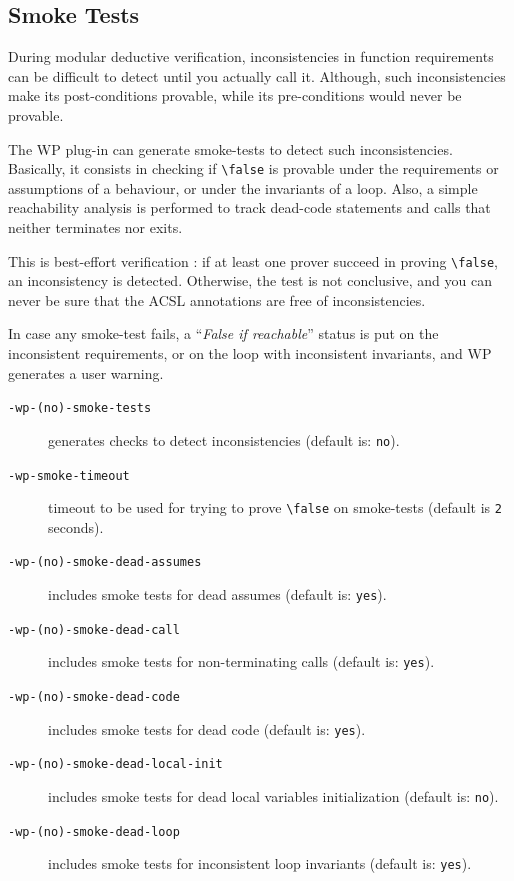 \subsection{Smoke Tests}

During modular deductive verification, inconsistencies in function requirements
can be difficult to detect until you actually call it.
Although, such inconsistencies make its post-conditions provable, while its pre-conditions
would never be provable.

The \textsf{WP} plug-in can generate smoke-tests to detect such inconsistencies.
Basically, it consists in checking if \verb+\false+ is provable under the requirements
or assumptions of a behaviour, or under the invariants of a loop. Also, a simple reachability
analysis is performed to track dead-code statements and calls that neither terminates nor exits.

This is best-effort verification : if at least one prover succeed in proving \verb+\false+,
an inconsistency is detected. Otherwise, the test is not conclusive, and you can never be sure
that the ACSL annotations are free of inconsistencies.

In case any smoke-test fails, a ``\textit{False if reachable}'' status is put on the
inconsistent requirements, or on the loop with inconsistent invariants, and
\textsf{WP} generates a user warning.

\begin{description}
\item[\tt -wp-(no)-smoke-tests] generates checks to detect inconsistencies
  (default is: \texttt{no}).
\item[\tt -wp-smoke-timeout] timeout to be used for trying to prove \verb+\false+
  on smoke-tests (default is \verb+2+ seconds).
\item[\tt -wp-(no)-smoke-dead-assumes] includes smoke tests for dead assumes
  (default is: \texttt{yes}).
\item[\tt -wp-(no)-smoke-dead-call] includes smoke tests for non-terminating
  calls (default is: \texttt{yes}).
\item[\tt -wp-(no)-smoke-dead-code] includes smoke tests for dead code (default
  is: \texttt{yes}).
\item[\tt -wp-(no)-smoke-dead-local-init] includes smoke tests for dead local
  variables initialization (default is: \texttt{no}).
\item[\tt -wp-(no)-smoke-dead-loop] includes smoke tests for inconsistent loop
  invariants (default is: \texttt{yes}).
\end{description}

